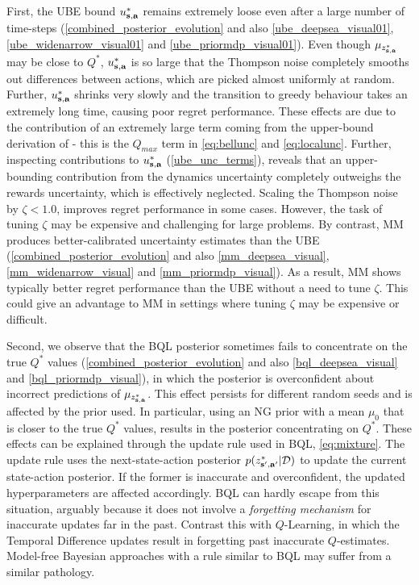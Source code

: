 \documentclass{article}
\begin{document}
First, the UBE bound $u^*_{\mathbf{s}, \mathbf{a}}$ remains extremely loose even after a large number of time-steps (\cref{combined_posterior_evolution} and also \cref{ube_deepsea_visual01}, \cref{ube_widenarrow_visual01} and \cref{ube_priormdp_visual01}). Even though $\mu_{z^*_{\mathbf{s}, \mathbf{a}}}$ may be close to $Q^*$, $u^*_{\mathbf{s}, \mathbf{a}}$ is so large that the Thompson noise completely smooths out differences between actions, which are picked almost uniformly at random. Further, $u^*_{\mathbf{s}, \mathbf{a}}$ shrinks very slowly and the transition to greedy behaviour takes an extremely long time, causing poor regret performance. These effects are due to the contribution of an extremely large term coming from the upper-bound derivation of \cite{ube} - this is the $Q_{max}$ term in \cref{eq:bellunc} and \cref{eq:localunc}. Further, inspecting contributions to $u^*_{\mathbf{s}, \mathbf{a}}$ (\cref{ube_unc_terms}), reveals that an upper-bounding contribution from the dynamics uncertainty completely outweighs the rewards uncertainty, which is effectively neglected. Scaling the Thompson noise by $\zeta < 1.0$, improves regret performance in some cases. However, the task of tuning $\zeta$ may be expensive and challenging for large problems. By contrast, MM produces better-calibrated uncertainty estimates than the UBE (\cref{combined_posterior_evolution} and also \cref{mm_deepsea_visual}, \cref{mm_widenarrow_visual} and \cref{mm_priormdp_visual}). As a result, MM shows typically better regret performance than the UBE without a need to tune $\zeta$. This could give an advantage to MM in settings where tuning $\zeta$ may be expensive or difficult.

Second, we observe that the BQL posterior sometimes fails to concentrate on the true $Q^*$ values (\cref{combined_posterior_evolution} and also \cref{bql_deepsea_visual} and \cref{bql_priormdp_visual}), in which the posterior is overconfident about incorrect predictions of $\mu_{z^*_{\mathbf{s}, \mathbf{a}}}$. This effect persists for different random seeds and is affected by the prior used. In particular, using an NG prior with a mean $\mu_0$ that is closer to the true $Q^*$ values, results in the posterior concentrating on $Q^*$. These effects can be explained through the update rule used in BQL, \cref{eq:mixture}. The update rule uses the next-state-action posterior $p(z^*_{\mathbf{s}', \mathbf{a}'} | \mathcal{D})$ to update the current state-action posterior. If the former is inaccurate and overconfident, the updated hyperparameters are affected accordingly. BQL can hardly escape from this situation, arguably because it does not involve a \textit{forgetting mechanism} for inaccurate updates far in the past. Contrast this with $Q$-Learning, in which the Temporal Difference updates result in forgetting past inaccurate $Q$-estimates. Model-free Bayesian approaches with a rule similar to BQL may suffer from a similar pathology.
\end{document}
